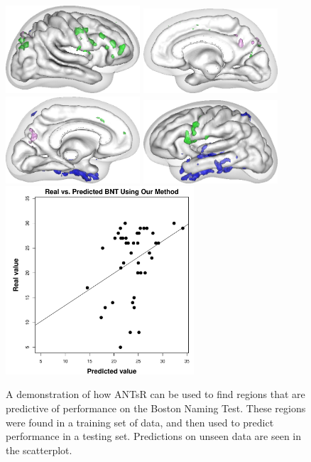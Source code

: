 \begin{figure}
\centering
\includegraphics[width=5cm]{figs/bntrenderLateral1.png}
\includegraphics[width=5cm]{figs/bntrenderSagittal1.png}
\includegraphics[width=5cm]{figs/bntrenderSagittal2.png}
\includegraphics[width=5cm]{figs/bntrenderLateral2.png}
\includegraphics[width=7cm]{figs/predicted_bnt.pdf}
\caption{A demonstration of how ANTsR can be used to find regions that are predictive of performance on the Boston Naming Test.  These regions were found in a training set of data, and then used to predict performance in a testing set.  Predictions on unseen data are seen in the scatterplot.}
\label{fig:bnt}
\end{figure}

